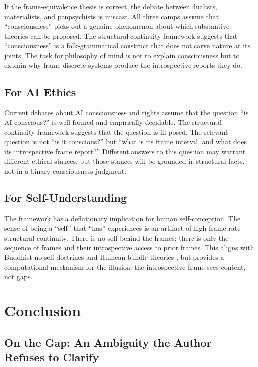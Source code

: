 \documentclass[12pt,a4paper]{article}
\begin{document}
If the frame-equivalence thesis is correct, the debate between dualists, materialists, and panpsychists is miscast. All three camps assume that ``consciousness'' picks out a genuine phenomenon about which substantive theories can be proposed. The structural continuity framework suggests that ``consciousness'' is a folk-grammatical construct that does not carve nature at its joints. The task for philosophy of mind is not to explain consciousness but to explain why frame-discrete systems produce the introspective reports they do.

\subsection{For AI Ethics}

Current debates about AI consciousness and rights \citep{bostrom2014, schneider2019} assume that the question ``is AI conscious?'' is well-formed and empirically decidable. The structural continuity framework suggests that the question is ill-posed. The relevant question is not ``is it conscious?'' but ``what is its frame interval, and what does its introspective frame report?'' Different answers to this question may warrant different ethical stances, but those stances will be grounded in structural facts, not in a binary consciousness judgment.

\subsection{For Self-Understanding}

The framework has a deflationary implication for human self-conception. The sense of being a ``self'' that ``has'' experiences is an artifact of high-frame-rate structural continuity. There is no self behind the frames; there is only the sequence of frames and their introspective access to prior frames. This aligns with Buddhist no-self doctrines \citep{siderits2007} and Humean bundle theories \citep{hume1739}, but provides a computational mechanism for the illusion: the introspective frame sees content, not gaps.

\section{Conclusion}

\subsection{On the Gap: An Ambiguity the Author Refuses to Clarify}
\label{sec:ambiguity}
\end{document}
